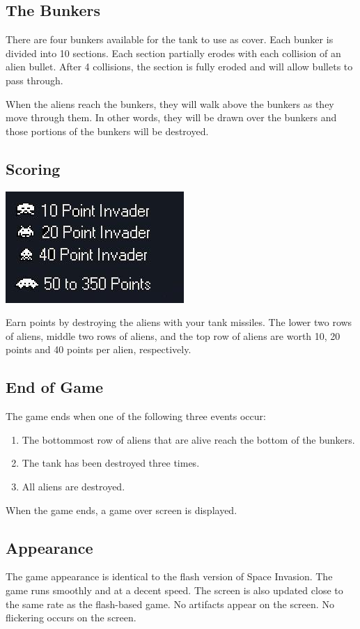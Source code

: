 \documentclass[11pt,letter,oneside]{report}
\begin{document}
\subsection{The Bunkers}
There are four bunkers available for the tank to use as cover.  Each bunker is divided into 10 sections.  Each section partially erodes with each collision of an alien bullet.  After 4 collisions, the section is fully eroded and will allow bullets to pass through.

When the aliens reach the bunkers, they will walk above the bunkers as they move through them. In other words, they will be drawn over the bunkers and those portions of the bunkers will be destroyed.


\subsection{Scoring}
\includegraphics[]{scoring.jpg}

Earn points by destroying the aliens with your tank missiles. The lower two rows of aliens, middle two rows of aliens, and the top row of aliens are worth 10, 20 points and 40 points per alien, respectively.

\subsection{End of Game}
The game ends when one of the following three events occur:
\begin{enumerate}
\item The bottommost row of aliens that are alive reach the bottom of the bunkers.
\item The tank has been destroyed three times.
\item All aliens are destroyed.
\end{enumerate}
When the game ends, a game over screen is displayed.

\subsection{Appearance}
The game appearance is identical to the flash version of Space Invasion. The game runs smoothly and at a decent speed. The screen is also updated close to the same rate as the flash-based game. No artifacts appear on the screen. No flickering occurs on the screen.
\end{document}
